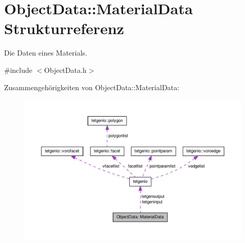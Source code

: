 \hypertarget{structObjectData_1_1MaterialData}{\section{Object\-Data\-:\-:Material\-Data Strukturreferenz}
\label{structObjectData_1_1MaterialData}
}


Die Daten eines Materials.  




{\ttfamily \#include $<$Object\-Data.\-h$>$}



Zusammengehörigkeiten von Object\-Data\-:\-:Material\-Data\-:
\nopagebreak
\begin{figure}[H]
\begin{center}
\leavevmode
\includegraphics[width=350pt]{structObjectData_1_1MaterialData__coll__graph}
\end{center}
\end{figure}
